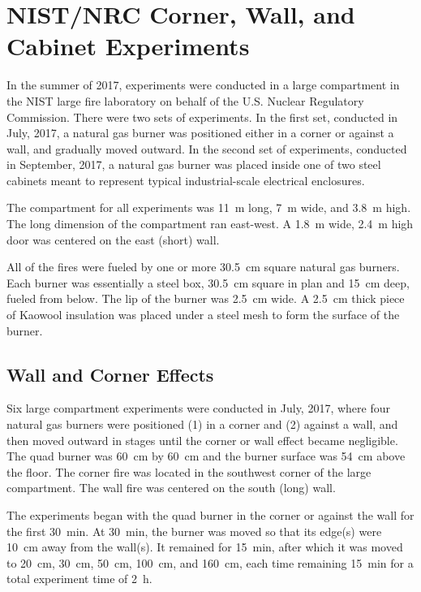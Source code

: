 \FloatBarrier


\section{NIST/NRC Corner, Wall, and Cabinet Experiments}

In the summer of 2017, experiments were conducted in a large compartment in the NIST large fire laboratory on behalf of the U.S. Nuclear Regulatory Commission. There were two sets of experiments. In the first set, conducted in July, 2017, a natural gas burner was positioned either in a corner or against a wall, and gradually moved outward. In the second set of experiments, conducted in September, 2017, a natural gas burner was placed inside one of two steel cabinets meant to represent typical industrial-scale electrical enclosures.

The compartment for all experiments was 11~m long, 7~m wide, and 3.8~m high. The long dimension of the compartment ran east-west. A 1.8~m wide, 2.4~m high door was centered on the east (short) wall.

All of the fires were fueled by one or more 30.5~cm square natural gas burners. Each burner was essentially a steel box, 30.5~cm square in plan and 15~cm deep, fueled from below. The lip of the burner was 2.5~cm wide. A 2.5~cm thick piece of Kaowool insulation was placed under a steel mesh to form the surface of the burner.

\subsection{Wall and Corner Effects}

Six large compartment experiments were conducted in July, 2017, where four natural gas burners were positioned (1) in a corner and (2) against a wall, and then moved outward in stages until the corner or wall effect became negligible. The quad burner was 60~cm by 60~cm and the burner surface was 54~cm above the floor. The corner fire was located in the southwest corner of the large compartment. The wall fire was centered on the south (long) wall.

The experiments began with the quad burner in the corner or against the wall for the first 30~min. At 30~min, the burner was moved so that its edge(s) were 10~cm away from the wall(s). It remained for 15~min, after which it was moved to 20~cm, 30~cm, 50~cm, 100~cm, and 160~cm, each time remaining 15~min for a total experiment time of 2~h.

